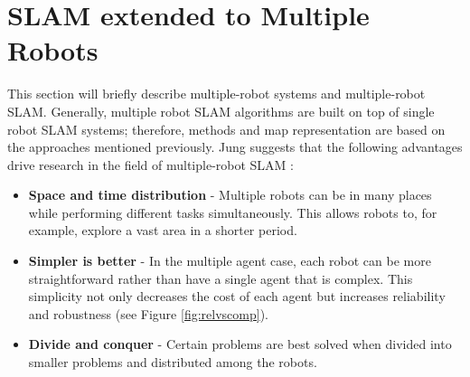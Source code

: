 \section{SLAM extended to Multiple Robots}
\label{sec:SLAMMR}
This section will briefly describe multiple-robot systems and multiple-robot SLAM. Generally, multiple robot SLAM algorithms are built on top of single robot SLAM systems; therefore, methods and map representation are based on the approaches mentioned previously. Jung suggests that the following advantages drive research in the field of multiple-robot SLAM \cite{Jung2000}:
\begin{itemize}
\item \textbf{Space and time distribution} - Multiple robots can be in many places while performing different tasks simultaneously. This allows robots to, for example, explore a vast area in a shorter period.
\item \textbf{Simpler is better} - In the multiple agent case, each robot can be more straightforward rather than have a single agent that is complex. This simplicity not only decreases the cost of each agent but increases reliability and robustness (see Figure \ref{fig:relvscomp}).
\item \textbf{Divide and conquer} - Certain problems are best solved when divided into smaller problems and distributed among the robots.
\end{itemize}

